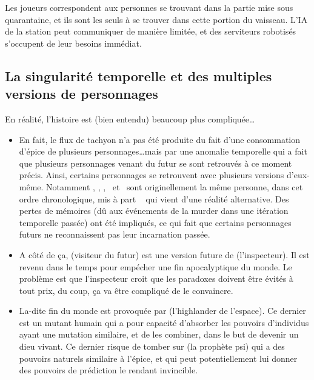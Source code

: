 {	\par Les joueurs correspondent aux personnes se trouvant dans la partie mise sous quarantaine, et ils sont les seuls à se trouver dans cette portion du vaisseau. L'IA de la station peut communiquer de manière limitée, et des serviteurs robotisés s'occupent de leur besoins immédiat.
	
	\subsection{La singularité temporelle et des multiples versions de personnages}
	
	\par En réalité, l'histoire est (bien entendu) beaucoup plus compliquée\dots
	\begin{itemize}
		\item En fait, le flux de tachyon n'a pas été produite du fait d'une consommation d'épice de plusieurs personnages\dots mais par une anomalie temporelle qui a fait que plusieurs personnages venant du futur se sont retrouvés à ce moment précis. Ainsi, certains personnages se retrouvent avec plusieurs versions d'eux-même. Notamment \nmPlayerI, \nmPlayerII, \nmPlayerIII, \nmPlayerIV ~et \nmPlayerVI ~sont originellement la même personne, dans cet ordre chronologique, mis à part \nmPlayerVI ~ qui vient d'une réalité alternative. Des pertes de mémoires (dû aux événements de la murder dans une itération temporelle passée) ont été impliqués, ce qui fait que certains personnages futurs ne reconnaissent pas leur incarnation passée.
		
		\item A côté de ça, \nmPlayerV (visiteur du futur) est une version future de \nmPlayerVII (l'inspecteur). Il est revenu dans le temps pour empécher une fin apocalyptique du monde. Le problème est que l'inspecteur croit que les paradoxes doivent être évités à tout prix, du coup, ça va être compliqué de le convaincre.
		
		\item La-dite fin du monde est provoquée par \nmPlayerX (l'highlander de l'espace). Ce dernier est un mutant humain qui a pour capacité d'absorber les pouvoirs d'individus ayant une mutation similaire, et de les combiner, dans le but de devenir un dieu vivant. Ce dernier risque de tomber sur \nmPlayerIX (la prophète psi) qui a des pouvoirs naturels similaire à l'épice, et qui peut potentiellement lui donner des pouvoirs de prédiction le rendant invincible.
		

\end{itemize}}
